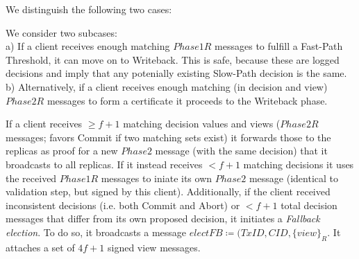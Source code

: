 
We distinguish the following two cases:

We consider two subcases:\\
a) If a client receives enough matching $Phase1R$ messages to fulfill a Fast-Path Threshold, it can move on to Writeback. This is safe, because these are logged decisions and imply that any potenially existing Slow-Path decision is the same.
b) Alternatively, if a client receives enough matching (in decision and view) $Phase2R$ messages to form a certificate it proceeds to the Writeback phase.\\



If a client receives $\geq f+1$ matching decision values and views ($Phase2R$ messages; favors Commit if two matching sets exist) it forwards those to the replicas as proof for a new $Phase2$ message (with the same decision) that it broadcasts to all replicas. If it instead receives $< f+1$ matching decisions it uses the received $Phase1R$ messages to iniate its own $Phase2$ message (identical to validation step, but signed by this client). 
Additionally, if the client received inconsistent decisions (i.e. both Commit and Abort) or $<f+1$ total decision messages that differ from its own proposed decision, it initiates a \textit{Fallback election}. To do so, it broadcasts a message $electFB \coloneqq (TxID, CID, \{view\}_R$. It attaches a set of $4f+1$ signed view messages.  

